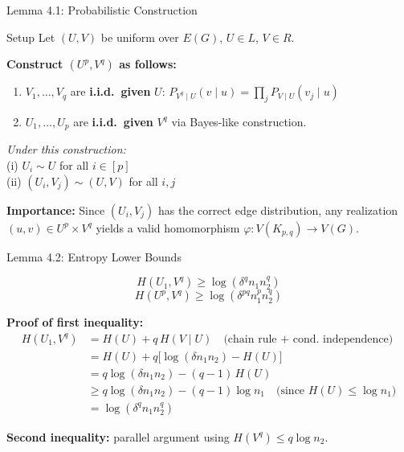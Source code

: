 \documentclass[10pt]{beamer}
\begin{document}
\begin{frame}{Lemma 4.1: Probabilistic Construction}
  \begin{block}{Setup}
    Let $(U,V)$ be uniform over $E(G)$, $U \in L$, $V \in R$.
  \end{block}

  \textbf{Construct $(U^p, V^q)$ as follows:}
  \begin{enumerate}
    \item $V_1, \ldots, V_q$ are \textbf{i.i.d.\ given} $U$: \quad
      $P_{V^q \mid U}(v \mid u) = \prod_j P_{V \mid U}(v_j \mid u)$
    \item $U_1, \ldots, U_p$ are \textbf{i.i.d.\ given} $V^q$ via Bayes-like construction.
  \end{enumerate}

  \begin{theorem}[Lemma 4.1]
    \textit{Under this construction:}\\[0.3em]
    \quad (i) $U_i \sim U$ for all $i \in [p]$\\
    \quad (ii) $(U_i, V_j) \sim (U,V)$ for all $i, j$
  \end{theorem}

  \textbf{Importance:} Since $(U_i, V_j)$ has the correct edge distribution, any realization
  $(u,v) \in U^p \times V^q$ yields a valid homomorphism $\varphi : V(K_{p,q}) \to V(G)$.
\end{frame}

\begin{frame}{Lemma 4.2: Entropy Lower Bounds}
  \begin{theorem}[Lemma 4.2]
    \[
      H(U_1, V^q) \geq \log(\delta^q n_1 n_2^q)
    \]
    \[
      H(U^p, V^q) \geq \log(\delta^{pq} n_1^p n_2^q)
    \]
  \end{theorem}

  \textbf{Proof of first inequality:}
  \begin{align*}
    H(U_1, V^q) &= H(U) + q\,H(V \mid U) \quad \text{(chain rule + cond.\ independence)}\\
                &= H(U) + q\bigl[\log(\delta n_1 n_2) - H(U)\bigr]\\
                &= q\log(\delta n_1 n_2) - (q-1)\,H(U)\\
                &\geq q\log(\delta n_1 n_2) - (q-1)\log n_1 \quad \text{(since $H(U) \leq \log n_1$)}\\
                &= \log(\delta^q n_1 n_2^q)
  \end{align*}

  \textbf{Second inequality:} parallel argument using $H(V^q) \leq q \log n_2$.
\end{frame}
\end{document}

